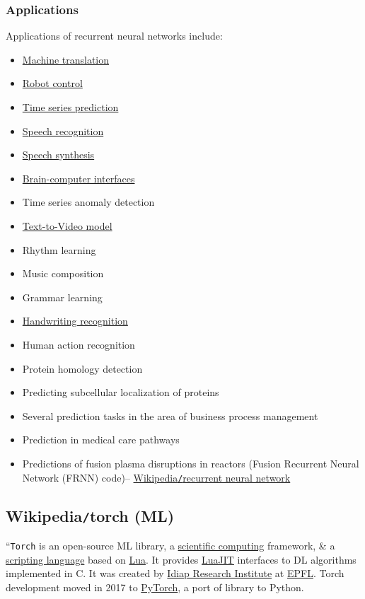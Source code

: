\documentclass{article}
\begin{document}
\subsubsection{Applications}
Applications of recurrent neural networks include:
\begin{itemize}
	\item \href{https://en.wikipedia.org/wiki/Machine_translation}{Machine translation}
	\item \href{https://en.wikipedia.org/wiki/Robot_control}{Robot control}
	\item \href{https://en.wikipedia.org/wiki/Time_series_prediction}{Time series prediction}
	\item \href{https://en.wikipedia.org/wiki/Speech_recognition}{Speech recognition}
	\item \href{https://en.wikipedia.org/wiki/Speech_synthesis}{Speech synthesis}
	\item \href{https://en.wikipedia.org/wiki/Brain%E2%80%93computer_interfaces}{Brain-computer interfaces}
	\item Time series anomaly detection
	\item \href{https://en.wikipedia.org/wiki/Text-to-Video_model}{Text-to-Video model}
	\item Rhythm learning
	\item Music composition
	\item Grammar learning
	\item \href{https://en.wikipedia.org/wiki/Handwriting_recognition}{Handwriting recognition}
	\item Human action recognition
	\item Protein homology detection
	\item Predicting subcellular localization of proteins
	\item Several prediction tasks in the area of business process management
	\item Prediction in medical care pathways
	\item Predictions of fusion plasma disruptions in reactors (Fusion Recurrent Neural Network (FRNN) code)-- \href{https://en.wikipedia.org/wiki/Recurrent_neural_network}{Wikipedia{\tt/}recurrent neural network}
\end{itemize}



\subsection{Wikipedia{\tt/}torch (ML)}
``{\tt Torch} is an open-source ML library, a \href{https://en.wikipedia.org/wiki/Scientific_computing}{scientific computing} framework, \& a \href{https://en.wikipedia.org/wiki/Scripting_language}{scripting language} based on \href{https://en.wikipedia.org/wiki/Lua_(programming_language)}{Lua}. It provides \href{https://en.wikipedia.org/wiki/LuaJIT}{LuaJIT} interfaces to DL algorithms implemented in C. It was created by \href{https://en.wikipedia.org/wiki/IDIAP}{Idiap Research Institute} at \href{https://en.wikipedia.org/wiki/EPFL}{EPFL}. Torch development moved in 2017 to \href{https://en.wikipedia.org/wiki/PyTorch}{PyTorch}, a port of library to Python.
\end{document}
